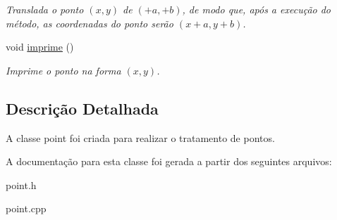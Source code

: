 \begin{DoxyCompactItemize}
\begin{DoxyCompactList}\small\item\em Translada o ponto $(x,y)$ de $(+a,+b)$, de modo que, após a execução do método, as coordenadas do ponto serão $(x+a,y+b)$. \end{DoxyCompactList}\item 
void \hyperlink{class_point_a1fb5c2501c27ab2cbc99d06c2a26a741}{imprime} ()\hypertarget{class_point_a1fb5c2501c27ab2cbc99d06c2a26a741}{}\label{class_point_a1fb5c2501c27ab2cbc99d06c2a26a741}

\begin{DoxyCompactList}\small\item\em Imprime o ponto na forma $(x,y)$. \end{DoxyCompactList}\end{DoxyCompactItemize}


\subsection{Descrição Detalhada}
A classe point foi criada para realizar o tratamento de pontos. 

A documentação para esta classe foi gerada a partir dos seguintes arquivos\+:\begin{DoxyCompactItemize}
\item 
point.\+h\item 
point.\+cpp\end{DoxyCompactItemize}
